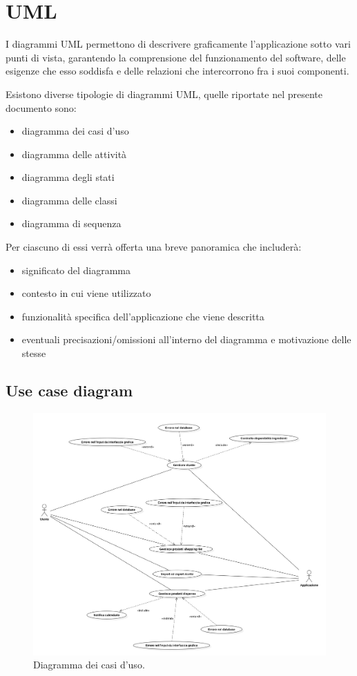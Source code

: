 \chapter{UML}

I diagrammi UML permettono di descrivere graficamente l'applicazione sotto vari punti di vista, garantendo la comprensione del funzionamento del software, delle esigenze che esso soddisfa e delle relazioni che intercorrono fra i suoi componenti.

Esistono diverse tipologie di diagrammi UML, quelle riportate nel presente documento sono:
\begin{itemize}
    \item diagramma dei casi d'uso
    \item diagramma delle attività
    \item diagramma degli stati
    \item diagramma delle classi
    \item diagramma di sequenza
\end{itemize}

Per ciascuno di essi verrà offerta una breve panoramica che includerà:
\begin{itemize}
    \item significato del diagramma 
    \item contesto in cui viene utilizzato
    \item funzionalità specifica dell'applicazione che viene descritta
    \item eventuali precisazioni/omissioni all'interno del diagramma e motivazione delle stesse
\end{itemize}

\section{Use case diagram}

\begin{figure}[H]
    \includegraphics[width=\linewidth]{images/use-case.png}
    \caption{Diagramma dei casi d'uso.}
    \label{fig:usecase}
\end{figure}

